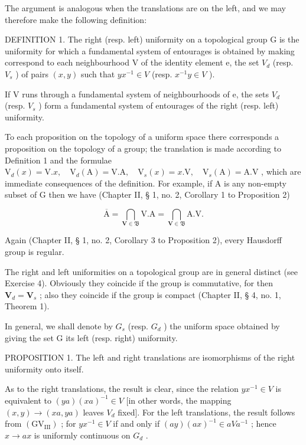 The argument is analogous when the translations are on the left, and we may therefore make the following definition:

DEFINITION 1. The right (resp. left) uniformity on a topological group G is the uniformity for which a fundamental system of entourages is obtained by making correspond to each neighbourhood V of the identity element e, the set \(V_{d}\) (resp. \(V_{s}\) ) of pairs \((x, y)\) such that \(y x^{-1} \in V\) (resp. \(x^{-1} y \in V\) ).

If V runs through a fundamental system of neighbourhoods of e, the sets \(V_{d}\) (resp. \(V_{s}\) ) form a fundamental system of entourages of the right (resp. left) uniformity.

To each proposition on the topology of a uniform space there corresponds a proposition on the topology of a group; the translation is made according to Definition 1 and the formulae \(\mathrm{V}_{d}(x)=\mathrm{V}.x,\quad\mathrm{V}_{d}(\mathrm{A})=\mathrm{V}.\mathrm{A},\quad\mathrm{V}_{s}(x)=x.\mathrm{V},\quad\mathrm{V}_{s}(\mathrm{A})=\mathrm{A}.\mathrm{V}\) , which are immediate consequences of the definition. For example, if A is any non-empty subset of G then we have (Chapter II, § 1, no. 2, Corollary 1 to Proposition 2)

\[
\overline {{{\mathrm{A}}}} = \bigcap_ {\mathbf {V} \in \mathfrak {B}} \mathrm{V}. \mathrm{A} = \bigcap_ {\mathbf {V} \in \mathfrak {B}} \mathrm{A}. \mathrm{V}.\tag{1}
\]

Again (Chapter II, § 1, no. 2, Corollary 3 to Proposition 2), every Hausdorff group is regular.

The right and left uniformities on a topological group are in general distinct (see Exercise 4). Obviously they coincide if the group is commutative, for then \(\mathbf{V}_d = \mathbf{V}_s\) ; also they coincide if the group is compact (Chapter II, § 4, no. 1, Theorem 1).

In general, we shall denote by \(G_{s}\) (resp. \(G_{d}\) ) the uniform space obtained by giving the set G its left (resp. right) uniformity.

PROPOSITION 1. The left and right translations are isomorphisms of the right uniformity onto itself.

As to the right translations, the result is clear, since the relation \(yx^{-1} \in V\) is equivalent to \((ya)(xa)^{-1} \in V\) {[}in other words, the mapping \((x, y) \to (xa, ya)\) leaves \(V_d\) fixed{]}. For the left translations, the result follows from \((\mathrm{GV}_{\mathrm{III}})\) ; for \(yx^{-1} \in V\) if and only if \((ay)(ax)^{-1} \in aVa^{-1}\) ; hence \(x \to ax\) is uniformly continuous on \(G_{d}\) .

